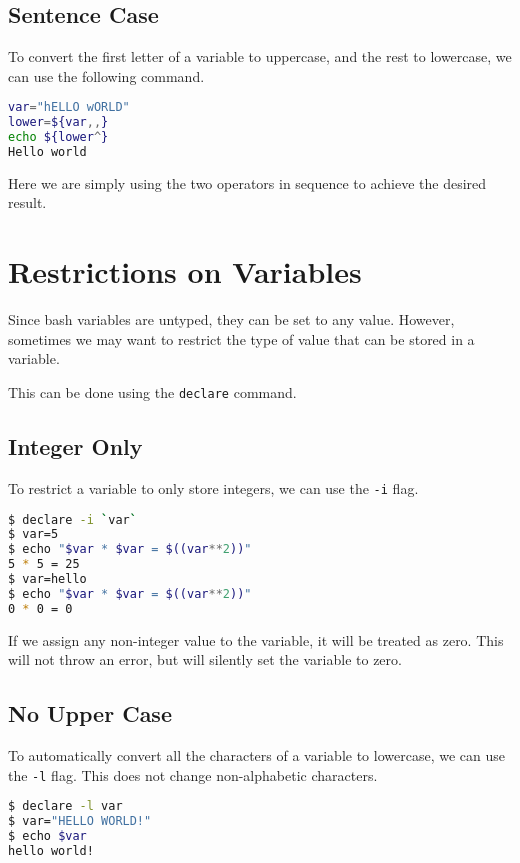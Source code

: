 \subsection{Sentence Case}

To convert the first letter of a variable to uppercase, and the rest to lowercase, we can use the following command.

\begin{lstlisting}[language=bash]
var="hELLO wORLD"
lower=${var,,}
echo ${lower^}
Hello world
\end{lstlisting}

Here we are simply using the two operators in sequence to achieve the desired result.

\section{Restrictions on Variables}

Since bash variables are untyped, they can be set to any value.
However, sometimes we may want to restrict the type of value that can be stored in a variable.

This can be done using the \lstinline{declare} command.

\subsection{Integer Only}

To restrict a variable to only store integers, we can use the \lstinline{-i} flag.

\begin{lstlisting}[language=bash]
$ declare -i `var`
$ var=5
$ echo "$var * $var = $((var**2))"
5 * 5 = 25
$ var=hello
$ echo "$var * $var = $((var**2))"
0 * 0 = 0
\end{lstlisting}

If we assign any non-integer value to the variable, it will be treated as zero.
This will not throw an error, but will silently set the variable to zero.

\subsection{No Upper Case}

To automatically convert all the characters of a variable to lowercase, we can use the \lstinline{-l} flag.
This does not change non-alphabetic characters.

\begin{lstlisting}[language=bash]
$ declare -l var
$ var="HELLO WORLD!"
$ echo $var
hello world!
\end{lstlisting}

